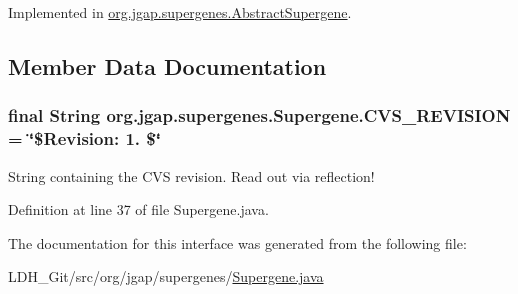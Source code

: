 Implemented in \hyperlink{classorg_1_1jgap_1_1supergenes_1_1_abstract_supergene_afae838561a1237ab6b39456ab0e3b8c8}{org.\-jgap.\-supergenes.\-Abstract\-Supergene}.



\subsection{Member Data Documentation}
\hypertarget{interfaceorg_1_1jgap_1_1supergenes_1_1_supergene_a2af8daabd0a582a9d761a3437c69be66}{
\subsubsection[{C\-V\-S\-\_\-\-R\-E\-V\-I\-S\-I\-O\-N}]{\setlength{\rightskip}{0pt plus 5cm}final String org.\-jgap.\-supergenes.\-Supergene.\-C\-V\-S\-\_\-\-R\-E\-V\-I\-S\-I\-O\-N = \char`\"{}\$Revision\-: 1. \$\char`\"{}\hspace{0.3cm}{\ttfamily [static]}}}\label{interfaceorg_1_1jgap_1_1supergenes_1_1_supergene_a2af8daabd0a582a9d761a3437c69be66}
String containing the C\-V\-S revision. Read out via reflection! 

Definition at line 37 of file Supergene.\-java.



The documentation for this interface was generated from the following file\-:\begin{DoxyCompactItemize}
\item 
L\-D\-H\-\_\-\-Git/src/org/jgap/supergenes/\hyperlink{_supergene_8java}{Supergene.\-java}\end{DoxyCompactItemize}
